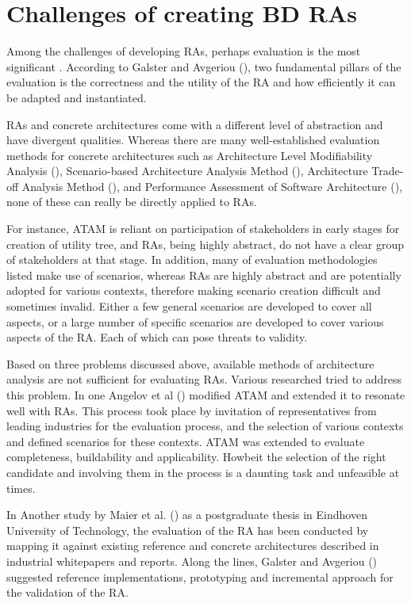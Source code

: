\documentclass[review]{elsarticle}
\begin{document}
\section{Challenges of creating BD RAs}

Among the challenges of developing RAs, perhaps evaluation is the most significant \cite{Maier}. According to Galster and Avgeriou (\cite{galster2011empirically}), two fundamental pillars of the evaluation is the correctness and the utility of the RA and how efficiently it can be adapted and instantiated. 

RAs and concrete architectures come with a different level of abstraction and have divergent qualities. Whereas there are many well-established evaluation methods for concrete architectures such as Architecture Level Modifiability Analysis (\cite{Bengtsson}), Scenario-based Architecture Analysis Method (\cite{kazman1994saam}), Architecture Trade-off Analysis Method (\cite{KazmanATAM}), and Performance Assessment of Software Architecture (\cite{Williams}), none of these can really be directly applied to RAs. 

For instance, ATAM is reliant on participation of stakeholders in early stages for creation of utility tree, and RAs, being highly abstract, do not have a clear group of stakeholders at that stage. In addition, many of evaluation methodologies listed make use of scenarios, whereas RAs are highly abstract and are potentially adopted for various contexts, therefore making scenario creation difficult and sometimes invalid. Either a few general scenarios are developed to cover all aspects, or a large number of specific scenarios are developed to cover various aspects of the RA. Each of which can pose threats to validity.

Based on three problems discussed above, available methods of architecture analysis are not sufficient for evaluating RAs. Various researched tried to address this problem. In one Angelov et al (\cite{angelov2008towards}) modified ATAM and extended it to resonate well with RAs. This process took place by invitation of representatives from leading industries for the evaluation process, and the selection of various contexts and defined scenarios for these contexts. ATAM was extended to evaluate completeness, buildability and applicability. Howbeit the selection of the right candidate and involving them in the process is a daunting task and unfeasible at times.

In Another study by Maier et al. (\cite{Maier}) as a postgraduate thesis in Eindhoven University of Technology, the evaluation of the RA has been conducted by mapping it against existing reference and concrete architectures described in industrial whitepapers and reports. Along the lines, Galster and Avgeriou (\cite{galster2011empirically}) suggested reference implementations, prototyping and incremental approach for the validation of the RA.
\end{document}
